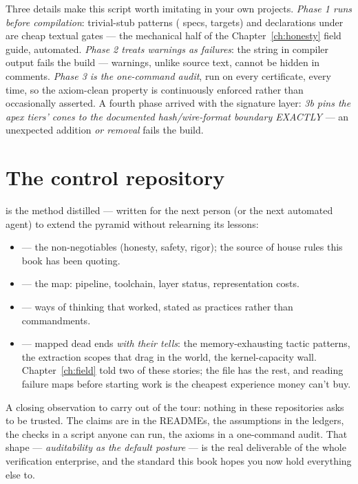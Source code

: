 Three details make this script worth imitating in your own projects.
\emph{Phase 1 runs before compilation}: trivial-stub patterns
( specs,  targets) and 
declarations under  are cheap textual gates --- the
mechanical half of the Chapter~\ref{ch:honesty} field guide, automated.
\emph{Phase 2 treats warnings as failures}: the string
 in compiler output fails the build --- warnings,
unlike source text, cannot be hidden in comments. \emph{Phase 3 is the
one-command audit}, run on every certificate, every time, so the
axiom-clean property is continuously enforced rather than occasionally
asserted. A fourth phase arrived with the signature layer: \emph{3b pins
the apex tiers' cones to the documented hash/wire-format boundary
EXACTLY} --- an unexpected addition \emph{or removal} fails the build.

\section{The control repository}

 is the method distilled --- written
for the next person (or the next automated agent) to extend the
pyramid without relearning its lessons:

\begin{itemize}[leftmargin=1.4em]
\item {} --- the non-negotiables (honesty, safety,
rigor); the source of house rules this book has been quoting.
\item {} --- the map: pipeline, toolchain, layer status,
representation costs.
\item {} --- ways of thinking that worked, stated as
practices rather than commandments.
\item {} --- mapped dead ends \emph{with their tells}:
the memory-exhausting tactic patterns, the extraction scopes that drag
in the world, the kernel-capacity wall. Chapter~\ref{ch:field} told two
of these stories; the file has the rest, and reading failure maps
before starting work is the cheapest experience money can't buy.
\end{itemize}

A closing observation to carry out of the tour: nothing in these
repositories asks to be trusted. The claims are in the READMEs, the
assumptions in the ledgers, the checks in a script anyone can run, the
axioms in a one-command audit. That shape --- \emph{auditability as the
default posture} --- is the real deliverable of the whole verification
enterprise, and the standard this book hopes you now hold everything
else to.
